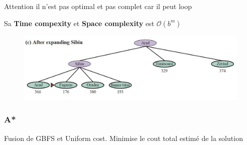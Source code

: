 			Attention il n'est pas optimal et pas complet car il peut loop
			
			Sa \textbf{Time compexity} et \textbf{Space complexity} est $\mathcal{O}(b^m)$
			
			\begin{figure}[htp]
				\centering
				\includegraphics[width=\textwidth]{img/GBFS.png}
			\end{figure}
		\subsubsection{A*}
		Fusion de GBFS et Uniform cost. Minimise le cout total estimé de la solution
		

